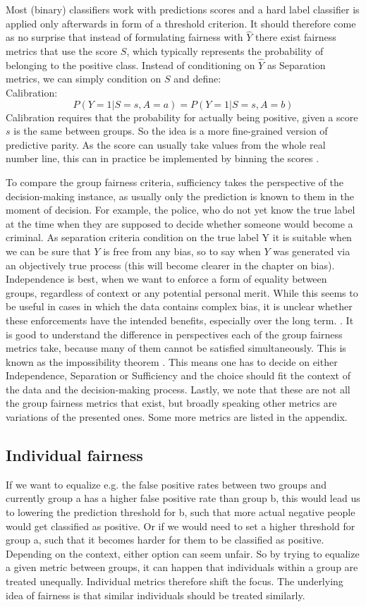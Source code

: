 Most (binary) classifiers work with predictions scores and a hard label classifier is applied only afterwards in form of a threshold criterion. It should therefore come as no surprise that instead of formulating fairness with $\hat{Y}$ there exist fairness metrics that use the score $S$, which typically represents the probability of belonging to the positive class. Instead of conditioning on $\hat{Y}$ as Separation metrics, we can simply condition on $S$ and define: \\
Calibration: $$P(Y = 1 | S = s, A = a) = P(Y = 1 | S = s, A = b)$$
Calibration requires that the probability for actually being positive, given a score $s$ is the same between groups. So the idea is a more fine-grained version of predictive parity. As the score can usually take values from the whole real number line, this can in practice be implemented by binning the scores \cite{verma2018}.

To compare the group fairness criteria, sufficiency takes the perspective of the decision-making instance, as usually only the prediction is known to them in the moment of decision. For example, the police, who do not yet know the true label at the time when they are supposed to decide whether someone would become a criminal.
As separation criteria condition on the true label Y it is suitable when we can be sure that $Y$ is free from any bias, so to say when $Y$ was generated via an objectively true process (this will become clearer in the chapter on bias).
Independence is best, when we want to enforce a form of equality between groups, regardless of context or any potential personal merit. While this seems to be useful in cases in which the data contains complex bias, it is unclear whether these enforcements have the intended benefits, especially over the long term. {\color{red}{Reference?}}.
It is good to understand the difference in perspectives each of the group fairness metrics take, because many of them cannot be satisfied simultaneously. This is known as the impossibility theorem \cite{hardt2016}. This means one has to decide on either Independence, Separation or Sufficiency and the choice should fit the context of the data and the decision-making process. Lastly, we note that these are not all the group fairness metrics that exist, but broadly speaking other metrics are variations of the presented ones. Some more metrics are listed in the appendix.

\subsection{Individual fairness}
If we want to equalize e.g. the false positive rates between two groups and currently group a has a higher false positive rate than group b, this would lead us to lowering the prediction threshold for b, such that more actual negative people would get classified as positive. Or if we would need to set a higher threshold for group a, such that it becomes harder for them to be classified as positive. Depending on the context, either option can seem unfair. So by trying to equalize a given metric between groups, it can happen that individuals within a group are treated unequally. Individual metrics therefore shift the focus. The underlying idea of fairness is that similar individuals should be treated similarly.
